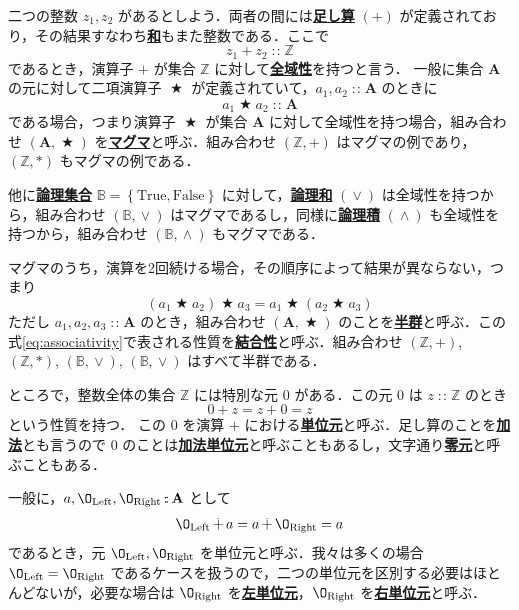 \documentclass[a4paper,twocolumn]{jsbook}
\newcommand{\keyword}[1]{{\underline{\textbf{#1}}}}
\newcommand{\mSpecialConst}[1]{\mathrm{#1}} %
\newcommand{\mFalse}{\mSpecialConst{False}}
\newcommand{\mTrue}{\mSpecialConst{True}}
\newcommand{\mZero}{\O}
\DeclareMathOperator{\mBinOp}{\bigstar}
\DeclareMathOperator{\mIn}{{:\!:}}
\DeclareMathOperator{\mLogicalAnd}{\wedge}
\DeclareMathOperator{\mLogicalOr}{\vee}
\DeclareMathOperator{\mPlus}{\dotplus}
\newcommand{\mSpecialSub}[1]{\text{#1}}
\newcommand{\mLeft}{\mSpecialSub{Left}}
\newcommand{\mRight}{\mSpecialSub{Right}}
\newcommand{\mSet}[1]{\mathbf{#1}}
\newcommand{\mSpecialSet}[1]{\mathbb{#1}} %
\newcommand{\mBSet}{\mSpecialSet{B}}
\newcommand{\mZSet}{\mSpecialSet{Z}}
\newcommand{\mSetWith}[1]{\left\{#1\right\}}
\newcommand{\mTupleWith}[1]{\left(#1\right)}
\begin{document}
二つの整数 $z_1,z_2$ があるとしよう．両者の間には\keyword{足し算} $(+)$ が定義されており，その結果すなわち\keyword{和}もまた整数である．ここで
\begin{equation}
z_1+z_2\mIn\mZSet
\end{equation}
であるとき，演算子 $+$ が集合 $\mZSet$ に対して\keyword{全域性}を持つと言う．
一般に集合 $\mSet{A}$ の元に対して二項演算子 $\mBinOp$ が定義されていて，$a_1,a_2\mIn\mSet{A}$ のときに
\begin{equation}
\label{eq:totality}
a_1\mBinOp a_2\mIn\mSet{A}
\end{equation}
である場合，つまり演算子 $\mBinOp$ が集合 $\mSet{A}$ に対して全域性を持つ場合，組み合わせ $\mTupleWith{\mSet{A},\mBinOp}$ を\keyword{マグマ}と呼ぶ．組み合わせ $\mTupleWith{\mZSet,+}$ はマグマの例であり，$\mTupleWith{\mZSet,*}$ もマグマの例である．

他に\keyword{論理集合} $\mBSet=\mSetWith{\mTrue,\mFalse}$ に対して，\keyword{論理和} $(\mLogicalOr)$ は全域性を持つから，組み合わせ $\mTupleWith{\mBSet,\mLogicalOr}$ はマグマであるし，同様に\keyword{論理積} $(\mLogicalAnd)$ も全域性を持つから，組み合わせ $\mTupleWith{\mBSet,\mLogicalAnd}$ もマグマである．

マグマのうち，演算を2回続ける場合，その順序によって結果が異ならない，つまり
\begin{equation}
\label{eq:associativity}
\left(a_1\mBinOp a_2\right)\mBinOp a_3
=a_1\mBinOp\left(a_2\mBinOp{a_3}\right)
\end{equation}
ただし $a_1,a_2,a_3\mIn\mSet{A}$ のとき，組み合わせ $\mTupleWith{\mSet{A},\mBinOp}$ のことを\keyword{半群}と呼ぶ．この式\eqref{eq:associativity}で表される性質を\keyword{結合性}と呼ぶ．組み合わせ $\mTupleWith{\mZSet,+}$, $\mTupleWith{\mZSet,*}$, $\mTupleWith{\mBSet,\mLogicalOr}$, $\mTupleWith{\mBSet,\mLogicalOr}$ はすべて半群である．

ところで，整数全体の集合 $\mZSet$ には特別な元 $0$ がある．この元 $0$ は $z\mIn\mZSet$ のとき
\begin{equation}
0+z=z+0=z
\end{equation}
という性質を持つ．
この $0$ を演算 $+$ における\keyword{単位元}と呼ぶ．足し算のことを\keyword{加法}とも言うので $0$ のことは\keyword{加法単位元}と呼ぶこともあるし，文字通り\keyword{零元}と呼ぶこともある．

一般に，$a,\mZero_\mLeft,\mZero_\mRight\mIn\mSet{A}$ として
\begin{equation}
\label{eq:identity}
\mZero_\mLeft\mPlus a=a\mPlus\mZero_\mRight=a
\end{equation}
であるとき，元 $\mZero_\mLeft,\mZero_\mRight$ を単位元と呼ぶ．我々は多くの場合 $\mZero_\mLeft=\mZero_\mRight$ であるケースを扱うので，二つの単位元を区別する必要はほとんどないが，必要な場合は $\mZero_\mRight$ を\keyword{左単位元}，$\mZero_\mRight$ を\keyword{右単位元}と呼ぶ．
\end{document}
